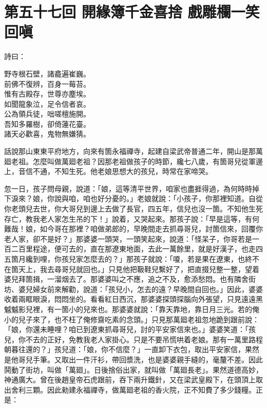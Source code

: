 
\chapter*{第五十七回 開緣簿千金喜捨 戲雕欄一笑回嗔}


詩曰：

\begin{myquote}
野寺根石壁，諸龕遍崔巍。\\前佛不復辨，百身一莓苔。\\惟有古殿存，世尊亦塵埃。\\如聞龍象泣，足令信者哀。\\公為領兵徒，咄嗟檀施開。\\吾知多羅樹，卻倚蓮花臺。\\諸天必歡喜，鬼物無嫌猜。
\end{myquote}

話說那山東東平府地方，向來有箇永福禪寺，起建自梁武帝普通二年，開山是那萬廻老祖。怎麼叫做萬廻老祖？因那老祖做孩子的時節，纔七八歲，有箇哥兒從軍邊上，音信不通，不知生死。他老娘思想大的孩兒，時常在家啼哭。

忽一日，孩子問母親，說道：「娘，這等清平世界，咱家也盡捱得過，為何時時掉下淚來？娘，你說與咱，咱也好分憂的。」老娘就說：「小孩子，你那裡知道。自從你老頭兒去世，你大哥兒到邊上去做了長官，四五年，信兒也沒一箇。不知他生死存亡，教我老人家怎生吊的下！」說着，又哭起來。那孩子說：「早是這等，有何難哉！娘，如今哥在那裡？咱做弟郎的，早晚間走去抓尋哥兒，討箇信來，回覆你老人家，卻不是好？」那婆婆一頭哭，一頭笑起來，說道：「怪呆子，你哥若是一百二百里程途，便可去的，直在那遼東地面，去此一萬餘里，就是好漢子，也走四五箇月纔到哩，你孩兒家怎麼去的？」那孩子就說：「嗄，若是果在遼東，也終不在箇天上，我去尋哥兒就回也。」只見他把靸鞋兒繫好了，把直掇兒整一整，望着婆兒拜箇揖，一溜烟去了。那婆婆叫之不應，追之不及，愈添愁悶。也有隣舍街坊、婆兒婦女前來解勸，說道：「孩兒小，怎去的遠？早晚間自回也。」因此，婆婆收着兩眶眼淚，悶悶坐的。看看紅日西沉，那婆婆探頭探腦向外張望，只見遠遠黑魆魆影兒裡，有一箇小的兒來也。那婆婆就說：「靠天靠地，靠日月三光。若的俺小的兒子來了，也不枉了俺修齋吃素的念頭。」只見那萬廻老祖忽地跪到跟前說：「娘，你還未睡哩？咱已到遼東抓尋哥兒，討的平安家信來也。」{}婆婆笑道：「孩兒，你不去的正好，免教我老人家掛心。只是不要吊慌哄着老娘。那有一萬里路程朝暮往還的？」孩兒道：「娘，你不信麼？」一直卸下衣包，取出平安家信，果然是他哥兒手筆。又取出一件汗衫，帶回漿洗，也是婆婆親手縫的，毫釐不差。因此鬨動了街坊，叫做「萬廻」。日後捨俗出家，就叫做「萬廻長老」。果然道德高妙，神通廣大。曾在後趙皇帝石虎跟前，吞下兩升鐵針，又在梁武皇殿下，在頭頂上取出舍利三顆。因此勑建永福禪寺，做萬廻老祖的香火院，正不知費了多少錢糧。正是：

